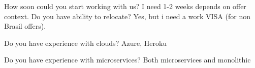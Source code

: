 
\begin{minipage}[t]{0.45\textwidth}


    \begin{entrylist}
        \entry
        {}
        {How soon could you start working with us?}
        {}
        {
            I need 1-2 weeks depends on offer context.
        }
        \entry
        {}
        {Do you have ability to relocate?}
        {}
        {
            Yes, but i need a work VISA (for non Brasil offers).
        }

    \end{entrylist}
\end{minipage}
\hfill
\begin{minipage}[t]{0.45\textwidth}


    \begin{entrylist}
        \entry
        {}
        {Do you have experience with clouds?}
        {}
        {
            Azure, Heroku
        }

        \entry
        {}
        {Do you have experience with microservices?}
        {}
        {
            Both microservices and monolithic
        }
    \end{entrylist}
\end{minipage}